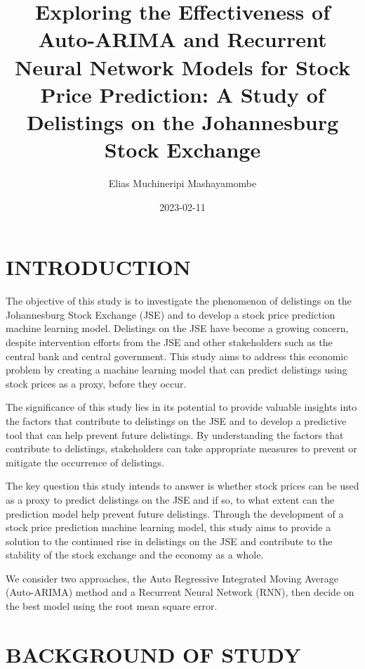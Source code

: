 \documentclass[
]{article}
\title{Exploring the Effectiveness of Auto-ARIMA and Recurrent Neural
Network Models for Stock Price Prediction: A Study of Delistings on the
Johannesburg Stock Exchange}
\author{Elias Muchineripi Mashayamombe}
\date{2023-02-11}
\begin{document}
\maketitle

\hypertarget{introduction}{%
\section{INTRODUCTION}\label{introduction}}

The objective of this study is to investigate the phenomenon of
delistings on the Johannesburg Stock Exchange (JSE) and to develop a
stock price prediction machine learning model. Delistings on the JSE
have become a growing concern, despite intervention efforts from the JSE
and other stakeholders such as the central bank and central government.
This study aims to address this economic problem by creating a machine
learning model that can predict delistings using stock prices as a
proxy, before they occur.

The significance of this study lies in its potential to provide valuable
insights into the factors that contribute to delistings on the JSE and
to develop a predictive tool that can help prevent future delistings. By
understanding the factors that contribute to delistings, stakeholders
can take appropriate measures to prevent or mitigate the occurrence of
delistings.

The key question this study intends to answer is whether stock prices
can be used as a proxy to predict delistings on the JSE and if so, to
what extent can the prediction model help prevent future delistings.
Through the development of a stock price prediction machine learning
model, this study aims to provide a solution to the continued rise in
delistings on the JSE and contribute to the stability of the stock
exchange and the economy as a whole.

We consider two approaches, the Auto Regressive Integrated Moving
Average (Auto-ARIMA) method and a Recurrent Neural Network (RNN), then
decide on the best model using the root mean square error.

\hypertarget{background-of-study}{%
\section{BACKGROUND OF STUDY}\label{background-of-study}}
\end{document}
